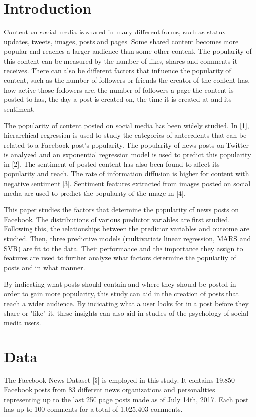 \documentclass[twoside]{article}
\begin{document}
\begin{multicols}{2} %
\section{Introduction}
Content on social media is shared in many different forms, such as status updates, tweets, images, posts and pages. Some shared content becomes more popular and reaches a larger audience than some other content. The popularity of this content can be measured by the number of likes, shares and comments it receives. There can also be different factors that influence the popularity of content, such as the number of followers or friends the creator of the content has, how active those followers are, the number of followers a page the content is posted to has, the day a post is created on, the time it is created at and its sentiment. 

The popularity of content posted on social media has been widely studied. In [1], hierarchical regression is used to study the categories of antecedents that can be related to a Facebook post's popularity. The popularity of news posts on Twitter is analyzed and an exponential regression model is used to predict this popularity in [2]. The sentiment of posted content has also been found to affect its popularity and reach. The rate of information diffusion is higher for content with negative sentiment [3]. Sentiment features extracted from images posted on social media are used to predict the popularity of the image in [4].

This paper studies the factors that determine the popularity of news posts on Facebook. The distributions of various predictor variables are first studied. Following this, the relationships between the predictor variables and outcome are studied. Then, three predictive models (multivariate linear regression, MARS and SVR) are fit to the data. Their performance and the importance they assign to features are used to further analyze what factors determine the popularity of posts and in what manner. 

By indicating what posts should contain and where they should be posted in order to gain more popularity, this study can aid in the creation of posts that reach a wider audience. By indicating what a user looks for in a post before they share or "like" it, these insights can also aid in studies of the psychology of social media users.
\section{Data}
The Facebook News Dataset [5] is employed in this study. It contains 19,850 Facebook posts from 83 different news organizations and personalities representing up to the last 250 page posts made as of July 14th, 2017. Each post has up to 100 comments for a total of 1,025,403 comments. 


\end{multicols}
\end{document}
